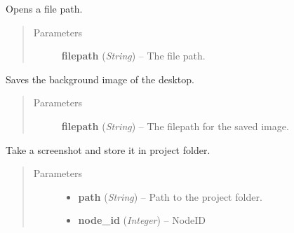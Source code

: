 \documentclass[letterpaper,10pt,english]{sphinxmanual}
\begin{document}

\begin{fulllineitems}
\label{filesystem:filesystem.open_file}
Opens a file path.
\begin{quote}\begin{description}
\item[{Parameters}] \leavevmode
\textbf{filepath} (\emph{String}) -- The file path.

\end{description}\end{quote}

\end{fulllineitems}


\begin{fulllineitems}
\label{filesystem:filesystem.save_screen}
Saves the background image of the desktop.
\begin{quote}\begin{description}
\item[{Parameters}] \leavevmode
\textbf{filepath} (\emph{String}) -- The filepath for the saved image.

\end{description}\end{quote}

\end{fulllineitems}


\begin{fulllineitems}
\label{filesystem:filesystem.screen_capture}
Take a screenshot and store it in project folder.
\begin{quote}\begin{description}
\item[{Parameters}] \leavevmode\begin{itemize}
\item {} 
\textbf{path} (\emph{String}) -- Path to the project folder.

\item {} 
\textbf{node\_id} (\emph{Integer}) -- NodeID

\end{itemize}

\end{description}\end{quote}

\end{fulllineitems}
\end{document}

